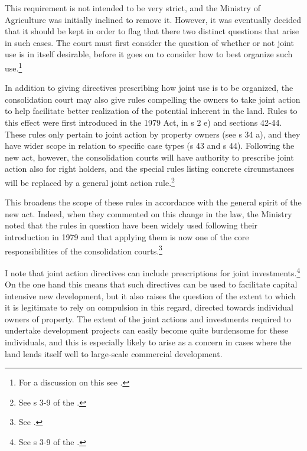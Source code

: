 This requirement is not intended to be very strict, and the Ministry of Agriculture was initially inclined to remove it. However, it was eventually decided that it should be kept in order to flag that there two distinct questions that arise in such cases. The court must first consider the question of whether or not joint use is in itself desirable, before it goes on to consider how to best organize such use.\footnote{For a discussion on this see \cite[140-141]{prop12}.}

In addition to giving directives prescribing how joint use is to be organized, the consolidation court may also give rules compelling the owners to take joint action to help facilitate better realization of the potential inherent in the land. Rules to this effect were first introduced in the 1979 Act, in s 2 e) and sections 42-44. These rules only pertain to joint action by property owners (see s 34 a), and they have wider scope in relation to specific case types (s 43 and s 44). Following the new act, however, the consolidation courts will have authority to prescribe joint action also for right holders, and the special rules listing concrete circumstances will be replaced by a general joint action rule.\footnote{See s 3-9 of the \cite{lca13}.}

This broadens the scope of these rules in accordance with the general spirit of the new act. Indeed, when they commented on this change in the law, the Ministry noted that the rules in question have been widely used following their introduction in 1979 and that applying them is now one of the core responsibilities of the consolidation courts.\footnote{See \cite[146]{prop12}.}

I note that joint action directives can include prescriptions for joint investments.\footnote{See s 3-9 of the \cite{lca13}.} On the one hand this means that such directives can be used to facilitate capital intensive new development, but it also raises the question of the extent to which it is legitimate to rely on compulsion in this regard, directed towards individual owners of property. The extent of the joint actions and investments required to undertake development projects can easily become quite burdensome for these individuals, and this is especially likely to arise as a concern in cases where the land lends itself well to large-scale commercial development.

